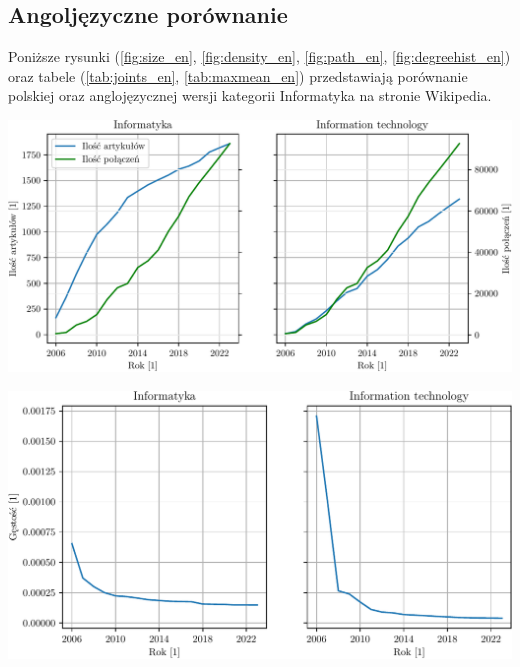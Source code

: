 \documentclass[a4paper, 12pt]{article}
\begin{document}
\begin{appendices}

\section{Angoljęzyczne porównanie}
Poniższe rysunki (\ref{fig:size_en}, \ref{fig:density_en}, \ref{fig:path_en}, \ref{fig:degreehist_en}) oraz tabele (\ref{tab:joints_en}, \ref{tab:maxmean_en}) przedstawiają porównanie polskiej oraz anglojęzycznej wersji kategorii Informatyka na stronie Wikipedia.

\begin{center}
    \includegraphics[width=\linewidth]{figures/size_en.pdf}
    \label{fig:size_en}
\end{center}

\begin{center}
    \includegraphics[width=\linewidth]{figures/density_en.pdf}
    \label{fig:density_en}
\end{center}


\end{appendices}
\end{document}
